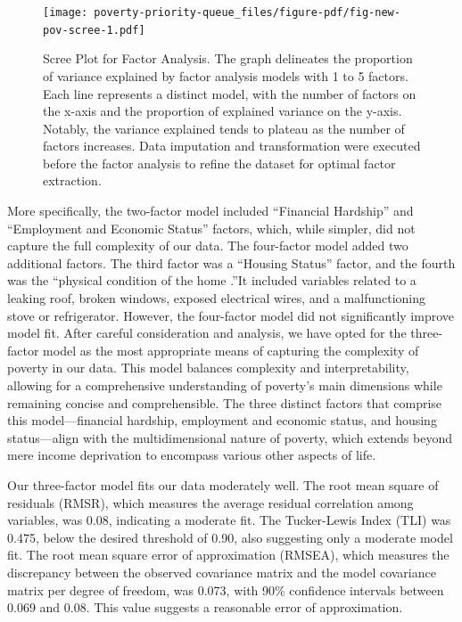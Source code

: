 \documentclass[
]{report}
\begin{document}
\begin{figure}

{\centering \texttt{[image: poverty-priority-queue\_files/figure-pdf/fig-new-pov-scree-1.pdf]}

}

\caption{\label{fig-new-pov-scree}Scree Plot for Factor Analysis. The
graph delineates the proportion of variance explained by factor analysis
models with 1 to 5 factors. Each line represents a distinct model, with
the number of factors on the x-axis and the proportion of explained
variance on the y-axis. Notably, the variance explained tends to plateau
as the number of factors increases. Data imputation and transformation
were executed before the factor analysis to refine the dataset for
optimal factor extraction.}

\end{figure}

More specifically, the two-factor model included ``Financial Hardship''
and ``Employment and Economic Status'' factors, which, while simpler,
did not capture the full complexity of our data. The four-factor model
added two additional factors. The third factor was a ``Housing Status''
factor, and the fourth was the ``physical condition of the home .''It
included variables related to a leaking roof, broken windows, exposed
electrical wires, and a malfunctioning stove or refrigerator. However,
the four-factor model did not significantly improve model fit. After
careful consideration and analysis, we have opted for the three-factor
model as the most appropriate means of capturing the complexity of
poverty in our data. This model balances complexity and
interpretability, allowing for a comprehensive understanding of
poverty's main dimensions while remaining concise and comprehensible.
The three distinct factors that comprise this model---financial
hardship, employment and economic status, and housing status---align
with the multidimensional nature of poverty, which extends beyond mere
income deprivation to encompass various other aspects of life.

Our three-factor model fits our data moderately well. The root mean
square of residuals (RMSR), which measures the average residual
correlation among variables, was 0.08, indicating a moderate fit. The
Tucker-Lewis Index (TLI) was 0.475, below the desired threshold of 0.90,
also suggesting only a moderate model fit. The root mean square error of
approximation (RMSEA), which measures the discrepancy between the
observed covariance matrix and the model covariance matrix per degree of
freedom, was 0.073, with 90\% confidence intervals between 0.069 and
0.08. This value suggests a reasonable error of approximation.
\end{document}
